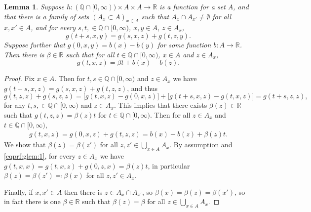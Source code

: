 \documentclass[reqno,draft]{amsart}
\numberwithin{equation}{section}
\theoremstyle{plain}
\newtheorem{lemma}[theorem]{Lemma}
\theoremstyle{remark}
\newcommand{\R}{\mathbb{R}} %
\newcommand{\Q}{\mathbb{Q}} %
\newcommand{\la}{\beta} %
\begin{document}
\begin{lemma}\label{lem:glem}
    Suppose $h\colon (\Q \cap [0,\infty)) \times A \times A \to \R$ is a function for a set $A$, and that there is a family of sets $(A_x\subset A)_{x\in A}$ such that $A_x \cap A_{x'} \neq \emptyset $ for all $x,x'\in A$, and for every $s,t,\in \Q \cap [0,\infty)$, $x,y\in A$, $z\in A_x$, \[
        g(t+s,x,y) = g(s,x,z) + g(t,z,y).
    \] Suppose further that $g(0,x,y) = b(x) - b(y)$ for some function $b\colon A \to \R$. Then there is $\la \in \R$ such that for all $t \in \Q \cap [0,\infty)$, $x\in A$ and $z\in A_x$, \[
    g(t,x,z) = \la t + b(x)-b(z).
    \]
\end{lemma}
\begin{proof}
    Fix $x\in A$. Then for $t,s\in \Q \cap [0,\infty)$ and $z\in A_x$ we have $g(t+s,x,z) = g(s,x,z) + g(t,z,z)$, and thus \[
        g(t,z,z) + g(s,z,z) = \Big[ g(t,x,z) - g(0,x,z)\Big] + \Big[ g(t+s,x,z) - g(t,x,z)\Big] = g(t+s,z,z),
    \] for any $t,s,\in \Q \cap [0,\infty)$ and $z\in A_x$. This implies that there exists $\la(z) \in \R$ such that $g(t,z,z) = \la(z) t$ for $t\in \Q \cap [0,\infty)$. Then for all $z\in A_x$ and $t \in \Q \cap [0,\infty)$,
    \begin{align}\label{eqprf:glem:1}
        g(t,x,z) = g(0,x,z) + g(t,z,z) = b(x)-b(z) + \la(z) t.
    \end{align}
    We show that $\la(z) = \la(z')$ for all $z,z'\in \bigcup_{x\in A} A_x$. By assumption and \cref{eqprf:glem:1}, for every $z\in A_x $ we have $g(t,x,x) = g(t,x,z) + g(0,z,x) = \la(z) t$, in particular $\la(z) = \la(z') \eqqcolon \la(x)$ for all $z,z'\in A_x$.

    Finally, if $x,x'\in A$ then there is $z\in A_x\cap A_{x'}$, so $\la(x) = \la(z) = \la(x')$, so in fact there is one $\la \in \R$ such that $\la(z) = \la$ for all $z\in \bigcup_{x\in A} A_x$.
\end{proof}






\end{document}
